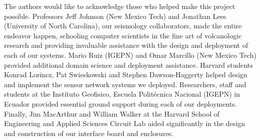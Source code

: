 The authors would like to acknowledge those who helped make this project
possible. Professors Jeff Johnson (New Mexico Tech) and Jonathan Lees
(University of North Carolina), our seismology collaborators, made the entire
endeavor happen, schooling computer scientists in the fine art of
volcanologic research and providing invaluable assistance with the design and
deployment of each of our systems. Mario Ruiz (IGEPN) and Omar Marcillo (New
Mexico Tech) provided additional domain science and deployment assistance.
Harvard students Konrad Lorincz, Pat Swieskowski and Stephen Dawson-Haggerty
helped design and implement the sensor network systems we deployed.
Researchers, staff and students at the Inst\'{i}tuto Geofisico, Escuela
Polit\'{e}cnica Nacional (IGEPN) in Ecuador provided essential ground support
during each of our deployments. Finally, Jim MacArthur and William Walker at
the Harvard School of Engineering and Applied Sciences Circuit Lab aided
significantly in the design and construction of our interface board and
enclosures.

